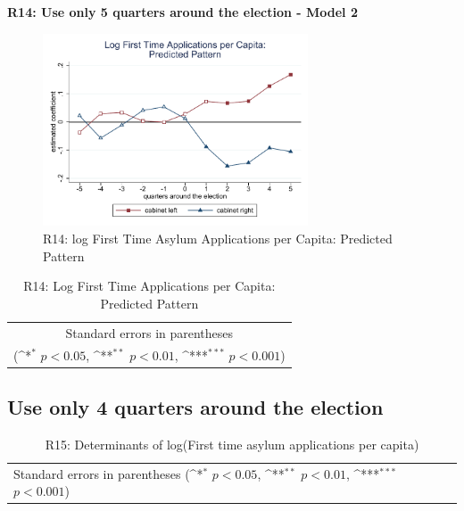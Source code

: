 \documentclass[10pt,a4paper]{scrartcl}
\begin{document}
\clearpage
\textbf{R14: Use only 5 quarters around the election - Model 2}
\begin{figure}[!ht]
	\centering
	\includegraphics[width=0.7\textwidth]{figures_edited/app_graph2_R14.pdf}
	\caption{R14: log First Time Asylum Applications per Capita: Predicted Pattern}
\end{figure}

\begin{table}[!ht]\centering
	\footnotesize
	\renewcommand{\arraystretch}{1.2}
	\def\sym#1{\ifmmode^{#1}\else\(^{#1}\)\fi}
	\caption{R14: Log First Time Applications per Capita: Predicted Pattern}
	\begin{tabular}{l*{2}{c}}
		\hline\hline
		
		\hline\hline
		\multicolumn{3}{c}{\footnotesize Standard errors in parentheses} \\
		\multicolumn{3}{c}{\footnotesize (\sym{*} \(p<0.05\), \sym{**} \(p<0.01\), \sym{***} \(p<0.001\))} \\
	\end{tabular}
\end{table}





\clearpage
\FloatBarrier
\subsection{Use only 4 quarters around the election}
\begin{table}[!ht]\centering
	\renewcommand{\arraystretch}{1.25}
	\small
	\def\sym#1{\ifmmode^{#1}\else\(^{#1}\)\fi}
	\caption{R15: Determinants of log(First time asylum applications per capita)}
	\begin{tabular}{l*{3}{c}}
		\hline\hline
		
		\hline\hline
		\multicolumn{4}{l}{\footnotesize Standard errors in parentheses (\sym{*} \(p<0.05\), \sym{**} \(p<0.01\), \sym{***} \(p<0.001\))}\\
	\end{tabular}
\end{table}
\end{document}
